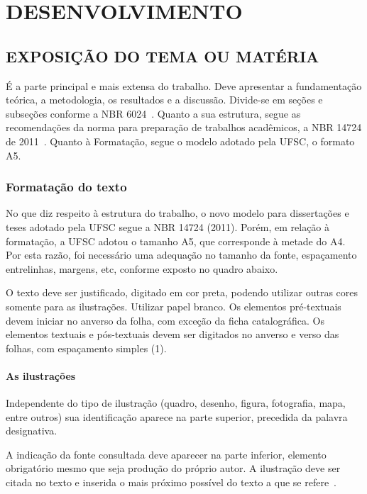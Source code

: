 
\chapter{DESENVOLVIMENTO}

\section{EXPOSIÇÃO DO TEMA OU MATÉRIA}

É a parte principal e mais extensa do trabalho.
Deve apresentar a fundamentação teórica,
a metodologia,
os resultados
e a discussão.
Divide-se em seções e subseções
conforme a NBR 6024~\cite{abnt14724}.
Quanto a sua estrutura,
segue as recomendações da norma
para preparação de trabalhos acadêmicos,
a NBR 14724 de 2011~\cite{abnt14724}.
Quanto à Formatação,
segue o modelo adotado pela UFSC, o formato A5.

\subsection{Formatação do texto}

No que diz respeito à estrutura do trabalho,
o novo modelo para dissertações e teses
adotado pela UFSC
segue a NBR 14724 (2011).
Porém, em relação à formatação,
a UFSC adotou o tamanho A5,
que corresponde à metade do A4.
Por esta razão,
foi necessário uma adequação no tamanho da fonte,
espaçamento entrelinhas,
margens,
etc,
conforme exposto no quadro abaixo.

O texto deve ser justificado,
digitado em cor preta,
podendo utilizar outras cores
somente para as ilustrações.
Utilizar papel branco.
Os elementos pré-textuais
devem iniciar no anverso da folha,
com exceção da ficha catalográfica.
Os elementos textuais e pós-textuais
devem ser digitados no anverso e verso das folhas,
com espaçamento simples (1).

\subsubsection{As ilustrações}

Independente do tipo de ilustração 
(quadro, desenho, figura, fotografia, mapa, entre outros)
sua identificação aparece na parte superior,
precedida da palavra designativa.

A indicação da fonte consultada
deve aparecer na parte inferior,
elemento obrigatório mesmo que seja produção do próprio autor.
A ilustração deve ser citada no texto
e inserida o mais próximo possível do texto
a que se refere~\cite{abnt14724}.


